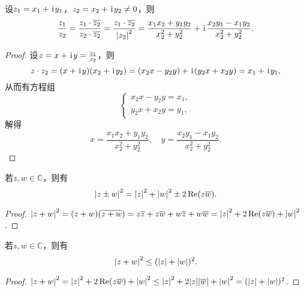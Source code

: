 \begin{theorem}
设\(z_1 = x_1 + \kern1pt\mathrm{i}\kern1pt y_1\)，\(z_2 = x_2 + \kern1pt\mathrm{i}\kern1pt y_2 \neq 0\)，则\begin{equation*}
\frac{z_1}{z_2}
= \frac{z_1 \cdot \overline{z_2}}{z_2 \cdot \overline{z_2}}
= \frac{z_1 \cdot \overline{z_2}}{\abs{z_2}^2}
= \frac{x_1 x_2 + y_1 y_2}{x_2^2 + y_2^2}
+ \kern1pt\mathrm{i}\kern1pt \frac{x_2 y_1 - x_1 y_2}{x_2^2 + y_2^2}.
\end{equation*}
\begin{proof}
设\(z = x + \kern1pt\mathrm{i}\kern1pt y = \frac{z_1}{z_2}\)，则\begin{equation*}
z \cdot z_2 = (x + \kern1pt\mathrm{i}\kern1pt y)(x_2 + \kern1pt\mathrm{i}\kern1pt y_2)
= (x_2 x - y_2 y) + \kern1pt\mathrm{i}\kern1pt(y_2 x + x_2 y)
= x_1 + \kern1pt\mathrm{i}\kern1pt y_1,
\end{equation*}从而有方程组\begin{equation*}
\left\{ \begin{array}{l}
x_2 x - y_2 y = x_1, \\
y_2 x + x_2 y = y_1,
\end{array} \right.
\end{equation*}解得\begin{equation*}
x = \frac{x_1 x_2 + y_1 y_2}{x_2^2 + y_2^2},
\quad
y = \frac{x_2 y_1 - x_1 y_2}{x_2^2 + y_2^2}.
\end{equation*}
\end{proof}
\end{theorem}

\begin{theorem}
若\(z,w \in \mathbb{C}\)，则有\begin{equation}
\abs{z \pm w}^2 = \abs{z}^2 + \abs{w}^2 \pm 2 \Re(z \overline{w}).
\end{equation}
\begin{proof}
\(
\abs{z + w}^2
= (z + w) (\overline{z + w})
= z\overline{z} + z\overline{w} + w\overline{z} + w\overline{w}
= \abs{z}^2 + 2 \Re(z\overline{w}) + \abs{w}^2
\).
\end{proof}
\end{theorem}

\begin{theorem}
若\(z,w \in \mathbb{C}\)，则有\begin{equation}
\abs{z + w}^2 \leq (\abs{z} + \abs{w})^2.
\end{equation}
\begin{proof}
\(
\abs{z + w}^2
= \abs{z}^2 + 2 \Re(z \overline{w}) + \abs{w}^2
\leq \abs{z}^2 + 2 \abs{z}\abs{\overline{w}} + \abs{w}^2
= (\abs{z} + \abs{w})^2
\).
\end{proof}
\end{theorem}

